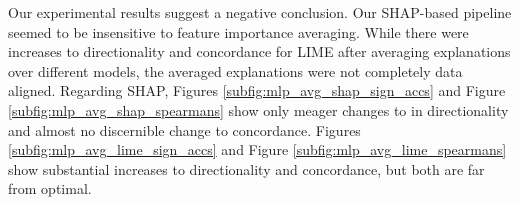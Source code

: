 \documentclass[mnsc,blindrev]{informs3}
\begin{document}
            Our experimental results suggest a negative conclusion. Our SHAP-based pipeline seemed to be insensitive to feature importance averaging. While there were increases to directionality and concordance for LIME after averaging explanations over different models, the averaged explanations were not completely data aligned.%
             Regarding SHAP, Figures \ref{subfig:mlp_avg_shap_sign_accs} and Figure \ref{subfig:mlp_avg_shap_spearmans} show only meager changes to in directionality and almost no discernible change to concordance. Figures \ref{subfig:mlp_avg_lime_sign_accs} and Figure \ref{subfig:mlp_avg_lime_spearmans} show substantial increases to directionality and concordance, but both are far from optimal. %
            
            
\end{document}
